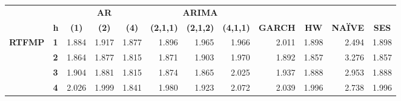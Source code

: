 \begin{table}[htbp]
  \centering
    \begin{tabular}{|cl|rrrrrrrrrr|}
\cmidrule{3-12}    \multicolumn{1}{r}{} &       & \multicolumn{3}{c}{\textbf{AR}} & \multicolumn{3}{c}{\textbf{ARIMA}} &       &       &       &  \\
    \multicolumn{1}{r}{} & \textbf{h} & \multicolumn{1}{c}{\textbf{(1)}} & \multicolumn{1}{c}{\textbf{(2)}} & \multicolumn{1}{c}{\textbf{(4)}} & \multicolumn{1}{c}{\textbf{(2,1,1)}} & \multicolumn{1}{c}{\textbf{(2,1,2)}} & \multicolumn{1}{c}{\textbf{(4,1,1)}} & \multicolumn{1}{c}{\textbf{GARCH}} & \multicolumn{1}{c}{\textbf{HW}} & \multicolumn{1}{c}{\textbf{NAÏVE}} & \multicolumn{1}{c|}{\textbf{SES}} \\
    \midrule
    \multirow{5}[2]{*}{\textbf{RTFMP}} & \textbf{1} & \cellcolor[rgb]{ .843,  .843,  .843}1.884 & \cellcolor[rgb]{ .839,  .839,  .839}1.917 & \cellcolor[rgb]{ .847,  .847,  .847}1.877 & \cellcolor[rgb]{ .843,  .843,  .843}1.896 & \cellcolor[rgb]{ .835,  .835,  .835}1.965 & \cellcolor[rgb]{ .835,  .835,  .835}1.966 & \cellcolor[rgb]{ .827,  .827,  .827}2.011 & \cellcolor[rgb]{ .843,  .843,  .843}1.898 & \cellcolor[rgb]{ .773,  .773,  .773}2.494 & \cellcolor[rgb]{ .843,  .843,  .843}1.898 \\
          & \textbf{2} & \cellcolor[rgb]{ .847,  .847,  .847}1.864 & \cellcolor[rgb]{ .847,  .847,  .847}1.877 & \cellcolor[rgb]{ .851,  .851,  .851}1.815 & \cellcolor[rgb]{ .847,  .847,  .847}1.871 & \cellcolor[rgb]{ .843,  .843,  .843}1.903 & \cellcolor[rgb]{ .835,  .835,  .835}1.970 & \cellcolor[rgb]{ .843,  .843,  .843}1.892 & \cellcolor[rgb]{ .847,  .847,  .847}1.857 & \cellcolor[rgb]{ .675,  .675,  .675}3.276 & \cellcolor[rgb]{ .847,  .847,  .847}1.857 \\
          & \textbf{3} & \cellcolor[rgb]{ .843,  .843,  .843}1.904 & \cellcolor[rgb]{ .843,  .843,  .843}1.881 & \cellcolor[rgb]{ .851,  .851,  .851}1.815 & \cellcolor[rgb]{ .847,  .847,  .847}1.874 & \cellcolor[rgb]{ .847,  .847,  .847}1.865 & \cellcolor[rgb]{ .827,  .827,  .827}2.025 & \cellcolor[rgb]{ .839,  .839,  .839}1.937 & \cellcolor[rgb]{ .843,  .843,  .843}1.888 & \cellcolor[rgb]{ .714,  .714,  .714}2.953 & \cellcolor[rgb]{ .843,  .843,  .843}1.888 \\
          & \textbf{4} & \cellcolor[rgb]{ .827,  .827,  .827}2.026 & \cellcolor[rgb]{ .831,  .831,  .831}1.999 & \cellcolor[rgb]{ .851,  .851,  .851}1.841 & \cellcolor[rgb]{ .831,  .831,  .831}1.980 & \cellcolor[rgb]{ .839,  .839,  .839}1.923 & \cellcolor[rgb]{ .824,  .824,  .824}2.072 & \cellcolor[rgb]{ .827,  .827,  .827}2.039 & \cellcolor[rgb]{ .831,  .831,  .831}1.996 & \cellcolor[rgb]{ .741,  .741,  .741}2.738 & \cellcolor[rgb]{ .831,  .831,  .831}1.996 \\

\end{tabular}
\end{table}
